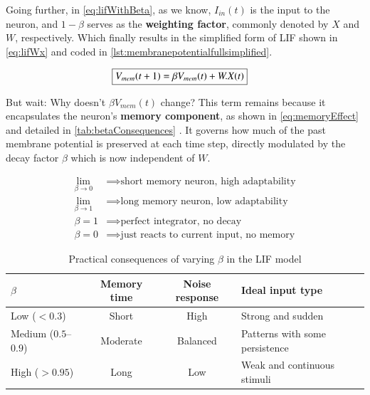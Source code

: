 			\par Going further, in \autoref{eq:lifWithBeta}, as we know, $I_{in}(t)$ is the input to the neuron, and $1 - \beta$ serves as the \textbf{weighting factor}, commonly denoted by $X$ and $W$, respectively. Which finally results in the simplified form of LIF shown in \autoref{eq:lifWx} and coded in \autoref{lst:membranepotentialfullsimplified}.
			
				\begin{equation}
					\label{eq:lifWx}
					\begin{aligned}
						\Aboxed{V_{mem}(t + 1) = \beta V_{mem}(t) + W.X(t)}
					\end{aligned}
				\end{equation}
			
			\par But wait: Why doesn't $\beta V_{mem}(t)$ change? This term remains because it encapsulates the neuron's \textbf{memory component}, as shown in \autoref{eq:memoryEffect} and detailed in \autoref{tab:betaConsequences} \cite{gerstner2014neuronal}. It governs how much of the past membrane potential is preserved at each time step, directly modulated by the decay factor $\beta$ which is now independent of $W$.
			
			\begin{equation}
				\label{eq:memoryEffect}
				\begin{aligned}
					\lim_{\beta \to 0} &\implies \text{short memory neuron, high adaptability} \\
					\lim_{\beta \to 1} &\implies \text{long memory neuron, low adaptability} \\
					\beta = 1 &\implies \text{perfect integrator, no decay} \\
					\beta = 0 &\implies \text{just reacts to current input, no memory}
				\end{aligned}
			\end{equation}

			\begin{table}[H]
				\centering
				\begin{tabularx}{\linewidth}{|l|c|c|>{\centering\arraybackslash}X|}
					\hline
					$\beta$ & Memory time & Noise response & Ideal input type \\
					\hline
					Low ($<0.3$) & Short & High & Strong and sudden \\
					\hline
					Medium ($0.5$--$0.9$) & Moderate & Balanced & Patterns with some persistence \\
					\hline
					High ($>0.95$) & Long & Low & Weak and continuous stimuli \\
					\hline
				\end{tabularx}
				\caption{Practical consequences of varying $\beta$ in the LIF model}
				\label{tab:betaConsequences}
			\end{table}
			
